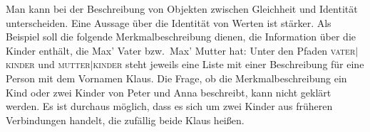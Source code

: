 Man kann bei der Beschreibung von Objekten zwischen Gleichheit und Identität
unterscheiden. Eine Aussage über die Identität von Werten ist stärker. Als
Beispiel soll die folgende Merkmalbeschreibung dienen, die Information
über die Kinder enthält, die Max' Vater bzw.\ Max' Mutter hat:
\ea
{}
\z
Unter den Pfaden \textsc{vater$|$kinder} und \textsc{mutter$|$kinder} steht jeweils
eine Liste mit einer Beschreibung für eine Person mit dem Vornamen Klaus.
Die Frage, ob die Merkmalbeschreibung ein Kind oder zwei Kinder von Peter und Anna
beschreibt, kann nicht geklärt werden. Es ist durchaus möglich,
dass es sich um zwei Kinder aus früheren Verbindungen handelt, die zufällig
beide Klaus heißen.

